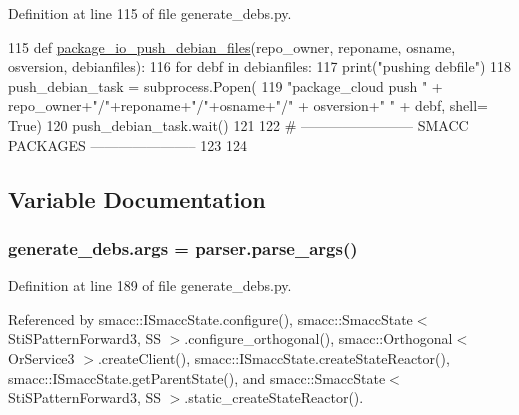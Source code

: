 Definition at line 115 of file generate\+\_\+debs.\+py.


\begin{DoxyCode}
115 \textcolor{keyword}{def }\hyperlink{namespacegenerate__debs_a1c65701328cab8c777b58c75f8d325e8}{package\_io\_push\_debian\_files}(repo\_owner, reponame,  osname, osversion, 
      debianfiles):
116     \textcolor{keywordflow}{for} debf \textcolor{keywordflow}{in} debianfiles:
117         print(\textcolor{stringliteral}{"pushing debfile"})
118         push\_debian\_task = subprocess.Popen(
119             \textcolor{stringliteral}{"package\_cloud push "} + repo\_owner+\textcolor{stringliteral}{"/"}+reponame+\textcolor{stringliteral}{"/"}+osname+\textcolor{stringliteral}{"/"} + osversion+\textcolor{stringliteral}{" "} + debf, shell=\textcolor{keyword}{
      True})
120         push\_debian\_task.wait()
121 
122 \textcolor{comment}{# ------------------------ SMACC PACKAGES -----------------------}
123 
124 
\end{DoxyCode}


\subsection{Variable Documentation}
\subsubsection[{\texorpdfstring{args}{args}}]{\setlength{\rightskip}{0pt plus 5cm}generate\+\_\+debs.\+args = parser.\+parse\+\_\+args()}\hypertarget{namespacegenerate__debs_a75f9143e38df82d83b2e8a6f99cae02c}{}\label{namespacegenerate__debs_a75f9143e38df82d83b2e8a6f99cae02c}


Definition at line 189 of file generate\+\_\+debs.\+py.



Referenced by smacc\+::\+I\+Smacc\+State.\+configure(), smacc\+::\+Smacc\+State$<$ Sti\+S\+Pattern\+Forward3, S\+S $>$.\+configure\+\_\+orthogonal(), smacc\+::\+Orthogonal$<$ Or\+Service3 $>$.\+create\+Client(), smacc\+::\+I\+Smacc\+State.\+create\+State\+Reactor(), smacc\+::\+I\+Smacc\+State.\+get\+Parent\+State(), and smacc\+::\+Smacc\+State$<$ Sti\+S\+Pattern\+Forward3, S\+S $>$.\+static\+\_\+create\+State\+Reactor().

